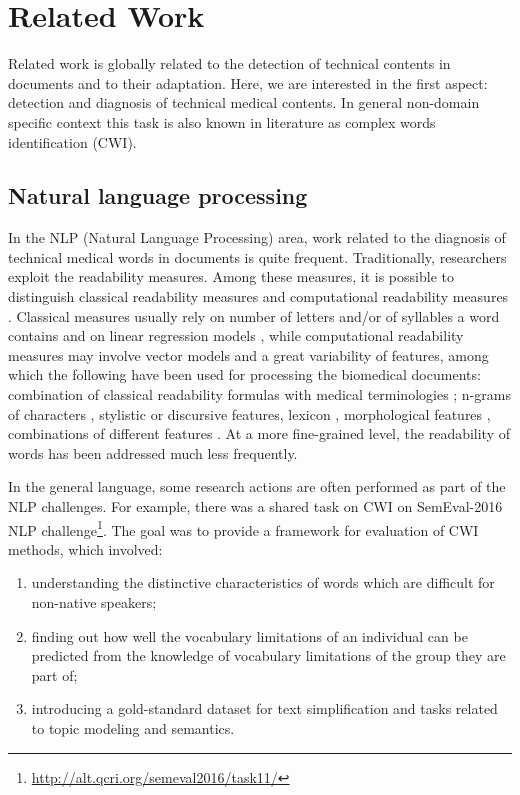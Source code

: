 \chapter{Related Work}
\label{ch:related-work}

Related work is globally related to the detection of technical contents in documents and to their adaptation. Here, we are interested in the first aspect: detection and diagnosis of technical medical contents. In general non-domain specific context this task is also known in literature as complex words identification (CWI). 

\section{Natural language processing}
In the NLP (Natural Language Processing) area, work related to the diagnosis of technical medical words in documents is quite frequent. Traditionally, researchers exploit the readability measures. Among these measures, it is possible to distinguish classical readability measures and computational readability measures \citep{Francois-TAL2013}. Classical measures usually rely on number of letters and/or of syllables a word contains and on linear regression models \citep{Flesch1948,Gunning1973}, while computational readability
measures may involve vector models and a great variability of
features, among which the following have been used for processing the
biomedical documents: combination of classical readability formulas
with medical terminologies \citep{Kokkinakis-2006}; n-grams of
characters \citep{Poprat-MIE2006}, stylistic \citep{Grabar-AMIA2007} or
discursive \citep{Goeuriot-LREC2008} features, lexicon
\citep{Miller-HICSS2007}, morphological features
\citep{Chmielik-TAL2011}, combinations of different features
\citep{Zeng-MEDINFO2007}. At a more fine-grained level, the readability of words has been
addressed much less frequently. 

In the general language, some research
actions are often performed as part of the NLP challenges. For example, there was a shared task on CWI on SemEval-2016 NLP challenge\footnote{\url{http://alt.qcri.org/semeval2016/task11/}}. The goal was to provide a framework for evaluation of CWI methods, which involved:
\begin{enumerate}
    \item understanding the distinctive characteristics of words which are difficult for non-native speakers;
    \item finding out how well the vocabulary limitations of an individual can be predicted from the knowledge of vocabulary limitations of the group they are part of;
    \item introducing a gold-standard dataset for text simplification and tasks related to topic modeling and semantics.
\end{enumerate}

